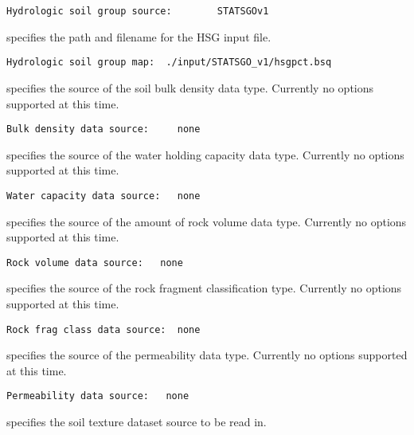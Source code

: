  \begin{Verbatim}[frame=single]
Hydrologic soil group source:        STATSGOv1
 \end{Verbatim}

 
  specifies the 
 path and filename for the HSG input file.
 

 \begin{Verbatim}[frame=single]
Hydrologic soil group map:  ./input/STATSGO_v1/hsgpct.bsq
 \end{Verbatim}

 
  specifies the
 source of the soil bulk density data type.
 Currently no options supported at this time.
 

 \begin{Verbatim}[frame=single]
Bulk density data source:     none
 \end{Verbatim}

 
  specifies the
 source of the water holding capacity data type.
 Currently no options supported at this time.
 

 \begin{Verbatim}[frame=single]
Water capacity data source:   none
 \end{Verbatim}

 
  specifies the
 source of the amount of rock volume data type.
 Currently no options supported at this time.
 

 \begin{Verbatim}[frame=single]
Rock volume data source:   none
 \end{Verbatim}

 
  specifies the
 source of the rock fragment classification type.
 Currently no options supported at this time.
 

 \begin{Verbatim}[frame=single]
Rock frag class data source:  none
 \end{Verbatim}

 
  specifies the
 source of the permeability data type.
 Currently no options supported at this time.
 

 \begin{Verbatim}[frame=single]
Permeability data source:   none
 \end{Verbatim}


 
  specifies the soil texture 
 dataset source to be read in.  
  

